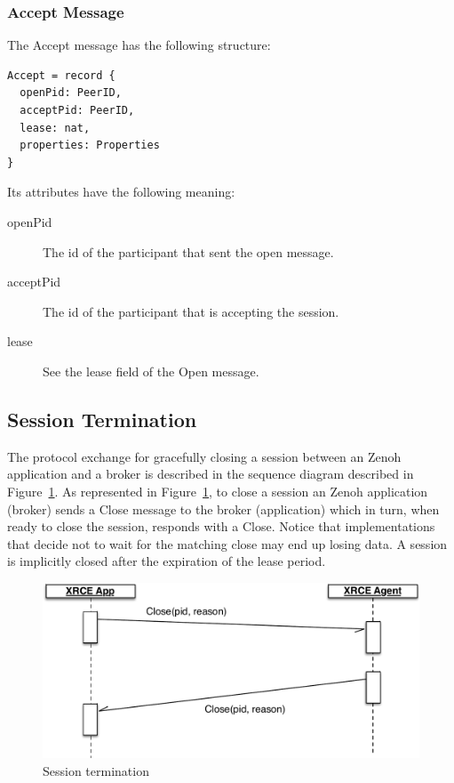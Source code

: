 \documentclass[a4paper,oneside,article]{memoir}
\begin{document}
\subsubsection{Accept Message}

The Accept message has the following structure:
\begin{verbatim}
Accept = record {
  openPid: PeerID,
  acceptPid: PeerID,
  lease: nat,
  properties: Properties
}  
\end{verbatim}

Its attributes have the following meaning:
\begin{description}
\item[openPid] The id of the participant that sent the open message.
\item[acceptPid] The id of the participant that is accepting the session.
\item[lease] See the lease field of the Open message.
\end{description}

\subsection{Session Termination}

The protocol exchange for gracefully closing a session between an Zenoh application and a broker is
described in the sequence diagram described in Figure~\ref{fig:close-session}.  As represented in
Figure~\ref{fig:close-session}, to close a session an Zenoh application (broker) sends a Close message
to the broker (application) which in turn, when ready to close the session, responds with a Close.
Notice that implementations that decide not to wait for the matching close may end up losing data.
A session is implicitly closed after the expiration of the lease period.
 
\begin{figure}
\centering
\includegraphics[scale=0.3]{close-session.pdf}
\caption{Session termination}\label{fig:close-session}
\end{figure}
\end{document}
